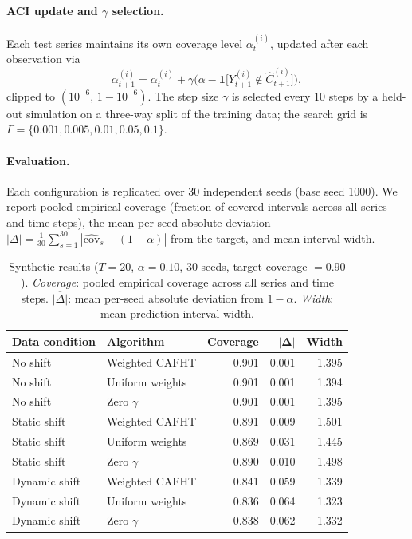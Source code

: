 \documentclass{article}
\numberwithin{equation}{section}
\begin{document}
\paragraph{ACI update and $\gamma$ selection.}
Each test series maintains its own coverage level $\alpha_t^{(i)}$, updated
after each observation via
%
\[
  \alpha_{t+1}^{(i)} = \alpha_t^{(i)}
    + \gamma \bigl(\alpha - \mathbf{1}\bigl[Y_{t+1}^{(i)} \notin
      \hat C_{t+1}^{(i)}\bigr]\bigr),
\]
%
clipped to $(10^{-6},\, 1 - 10^{-6})$.  The step size $\gamma$ is selected
every 10 steps by a held-out simulation on a three-way split of the training
data; the search grid is $\Gamma = \{0.001, 0.005, 0.01, 0.05, 0.1\}$.

\paragraph{Evaluation.}
Each configuration is replicated over 30 independent seeds (base seed 1000).
We report pooled empirical coverage (fraction of covered intervals across all
series and time steps), the mean per-seed absolute deviation
$\overline{|\Delta|} = \frac{1}{30}\sum_{s=1}^{30}
|\hat{\mathrm{cov}}_s - (1-\alpha)|$ from the target, and mean interval
width.



\begin{table}[ht]
\centering
\small
\setlength{\tabcolsep}{8pt}
\renewcommand{\arraystretch}{1.15}
\caption{%
  Synthetic results ($T=20$, $\alpha=0.10$, 30 seeds, target coverage $= 0.90$).
  \textit{Coverage}: pooled empirical coverage across all series and time steps.
  $\overline{|\Delta|}$: mean per-seed absolute deviation from $1-\alpha$.
  \textit{Width}: mean prediction interval width.
}
\label{tab:synthetic}
\begin{tabular}{@{} llrrr @{}}
\toprule
{\bfseries Data condition} & {\bfseries Algorithm}
  & {\bfseries Coverage} & $\boldsymbol{\overline{|\Delta|}}$ & {\bfseries Width} \\
\midrule
No shift
  & Weighted CAFHT      & 0.901 & 0.001 & 1.395 \\
No shift
  & Uniform weights     & 0.901 & 0.001 & 1.394 \\
No shift
  & Zero $\gamma$       & 0.901 & 0.001 & 1.395 \\
\midrule
Static shift
  & Weighted CAFHT      & 0.891 & 0.009 & 1.501 \\
Static shift
  & Uniform weights     & 0.869 & 0.031 & 1.445 \\
Static shift
  & Zero $\gamma$       & 0.890 & 0.010 & 1.498 \\
\midrule
Dynamic shift
  & Weighted CAFHT      & 0.841 & 0.059 & 1.339 \\
Dynamic shift
  & Uniform weights     & 0.836 & 0.064 & 1.323 \\
Dynamic shift
  & Zero $\gamma$       & 0.838 & 0.062 & 1.332 \\
\bottomrule
\end{tabular}
\end{table}
\end{document}
